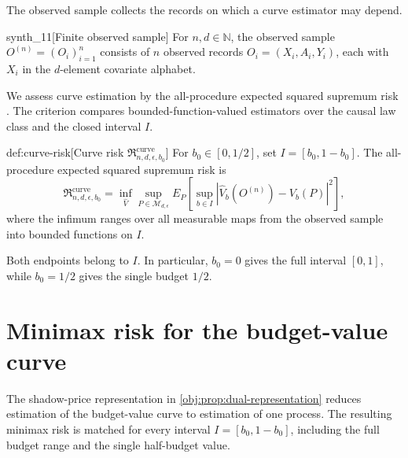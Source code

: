 \documentclass[11pt]{article}
\begin{document}
The observed sample collects the records on which a curve estimator may depend.

\begin{definitionv}{synth_11}[Finite observed sample]
For \(n,d\in\mathbb N\), the observed sample \(O^{(n)}=(O_i)_{i=1}^n\) consists of \(n\) observed records \(O_i=(X_i,A_i,Y_i)\), each with \(X_i\) in the \(d\)-element covariate alphabet.
\end{definitionv}

We assess curve estimation by the all-procedure expected squared supremum risk . The criterion compares bounded-function-valued estimators over the causal law class and the closed interval \(I\).

\begin{definitionv}{def:curve-risk}[Curve risk $\mathfrak R_{n,d,\epsilon,b_0}^{\mathrm{curve}}$]
For \(b_0\in[0,1/2]\), set \(I=[b_0,1-b_0]\). The all-procedure expected squared supremum risk is
\[
\mathfrak R_{n,d,\epsilon,b_0}^{\mathrm{curve}}
=
\inf_{\widehat V}
\sup_{P\in\mathcal M_{d,\epsilon}}
E_P\!\left[
\sup_{b\in I}
\left|\widehat V_b(O^{(n)})-V_b(P)\right|^2
\right],
\]
where the infimum ranges over all measurable maps from the observed sample into bounded functions on \(I\).
\end{definitionv}

Both endpoints belong to \(I\). In particular, \(b_0=0\) gives the full interval \([0,1]\), while \(b_0=1/2\) gives the single budget \(1/2\).


\section{Minimax risk for the budget-value curve}

The shadow-price representation in \cref{obj:prop:dual-representation} reduces estimation of the budget-value curve to estimation of one process. The resulting minimax risk is matched for every interval \(I=[b_0,1-b_0]\), including the full budget range and the single half-budget value.
\end{document}
